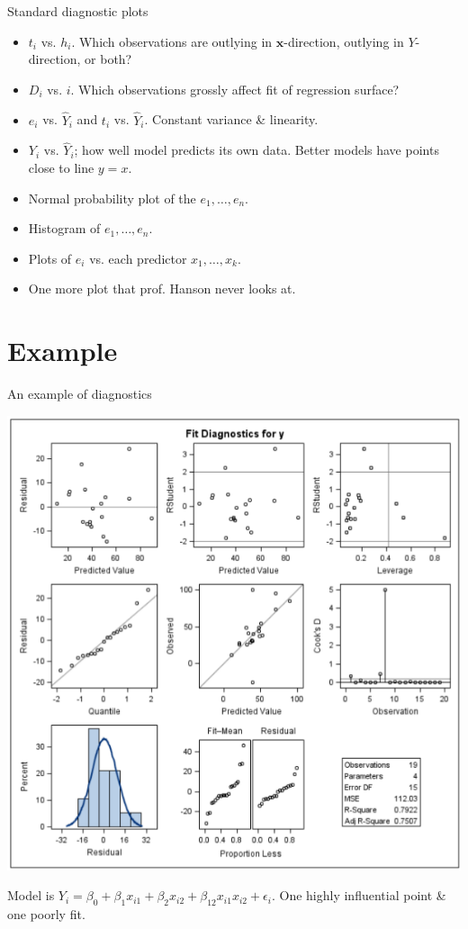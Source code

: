 \documentclass{beamer}
\begin{document}
\begin{frame}{Standard diagnostic plots}
\begin{itemize}
\item $t_i$ vs. $h_i$. Which observations are outlying in $\mathbf{x}$-direction, outlying in $Y$-direction, or both?
\item $D_i$ vs. $i$. Which observations grossly affect fit of regression surface?
\item $e_i$ vs. $\hat{Y}_i$ and $t_i$ vs. $\hat{Y}_i$. Constant variance \& linearity.
\item $Y_i$ vs. $\hat{Y}_i$; how well model predicts its own data. Better models have points close to line $y = x$.
\item Normal probability plot of the $e_1, \ldots, e_n$.
\item Histogram of $e_1, \ldots, e_n$.
\item Plots of $e_i$ vs. each predictor $x_1 , \ldots, x_k$.
\item One more plot that prof. Hanson never looks at.
\end{itemize}
\end{frame}

\section{Example}

\begin{frame}{An example of diagnostics}
\centerline{\includegraphics[height=.7\textheight]{plots/bp-diag}}
\vspace{10pt}
Model is $Y_i=\beta_0+\beta_1 x_{i1} + \beta_2 x_{i2} + \beta_{12} x_{i1} x_{i2} + \epsilon_i$. One highly influential point \& one poorly fit.
\end{frame}
\end{document}

